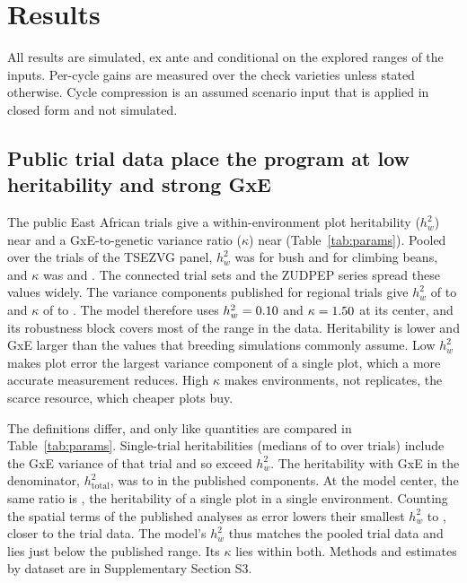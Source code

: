 \section{Results}\label{sec:results}

All results are simulated, ex ante and conditional on the explored ranges of the inputs. Per-cycle gains are measured over the check varieties unless stated otherwise. Cycle compression is an assumed scenario input that is applied in closed form and not simulated.

\subsection{Public trial data place the program at low heritability and strong GxE}\label{sec:res_params}

The public East African trials give a within-environment plot heritability ($h^2_w$) near \NumEmpTZHtwoAll and a GxE-to-genetic variance ratio ($\kappa$) near \NumEmpTZKappaAll (Table~\ref{tab:params}). Pooled over the \NumEmpTZNenvAll trials of the TSEZVG panel, $h^2_w$ was \NumEmpTZHtwoBush for bush and \NumEmpTZHtwoClimb for climbing beans, and $\kappa$ was \NumEmpTZKappaBush and \NumEmpTZKappaClimb. The connected trial sets and the ZUDPEP series spread these values widely. The variance components published for regional trials \citep{Amongi2023Gain,Amongi2025Yield} give $h^2_w$ of \NumPubHtwoWMin to \NumPubHtwoWMax and $\kappa$ of \NumPubKappaMin to \NumPubKappaMax. The model therefore uses $h^2_w = 0.10$ and $\kappa = 1.50$ at its center, and its robustness block covers most of the range in the data. Heritability is lower and GxE larger than the values that breeding simulations commonly assume. Low $h^2_w$ makes plot error the largest variance component of a single plot, which a more accurate measurement reduces. High $\kappa$ makes environments, not replicates, the scarce resource, which cheaper plots buy.

The definitions differ, and only like quantities are compared in Table~\ref{tab:params}. Single-trial heritabilities (medians of \NumEmpTrialHtwoMedZD to \NumEmpTrialHtwoMedTZ over \NumEmpNtrials trials) include the GxE variance of that trial and so exceed $h^2_w$. The heritability with GxE in the denominator, $h^2_{\mathrm{total}}$, was \NumPubHtwoPlotMin to \NumPubHtwoPlotMax in the published components. At the model center, the same ratio is \NumChainHtwoONMan, the heritability of a single plot in a single environment. Counting the spatial terms of the published analyses as error lowers their smallest $h^2_w$ to \NumPubHtwoWSpatialMin, closer to the trial data. The model's $h^2_w$ thus matches the pooled trial data and lies just below the published range. Its $\kappa$ lies within both. Methods and estimates by dataset are in Supplementary Section S3.

